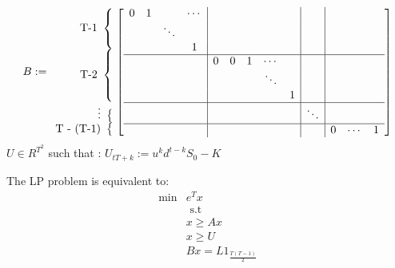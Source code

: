 \documentclass[12pt]{article}
\begin{document}
\begin{enumerate}
  \[
    B := 
    \begin{array}{r@{}}
      \text{T-1}~\left\{\begin{array}{@{}c@{}}\null\\\null\\\null\end{array}\right.\\
      \text{T-2}~\left\{\begin{array}{@{}c@{}}\null\\\null\\\null\\\null\end{array}\right.\\
      \text{\vdots}~\left\{\begin{array}{@{}c@{}}\null\end{array}\right.\\
      \text{T - (T-1)}~\left\{\begin{array}{@{}c@{}}\null\end{array}\right.\\
    \end{array}
  \left [
    \begin{array}{cccc|ccccc|c|ccc}
      0 & 1      &        &\cdots &&& &&& &&& \\
        &        & \ddots &       &&& &&& &&& \\
        &        &        & 1     &&& &&& &&& \\
      \hline
        &        &        &       & 0 & 0 & 1 & \cdots &   &&&&\\
        &        &        &       &   &   &   & \ddots &   &&&& \\
        &        &        &       &   &   &   &        & 1 &&&&\\
      \hline
        &        &        &       &   &   &   &        & & \ddots \\
      \hline
        &        &        &       &   &   &   &        & &        & 0 & \cdots & 1 \\
    \end{array}
  \right ]
\]
 $U \in R^{T^2}$ such that : $U_{tT + k} := u^kd^{t-k}S_0 - K$

 The LP problem is equivalent to:
 \begin{align*}
    \min & e^T x \\
         &\text{ s.t } \\
         & x \ge Ax \\
         & x \ge U\\
         & Bx = L 1_{\frac{T(T-1)}2}
  \end{align*}
 

\end{enumerate}
\end{document}
